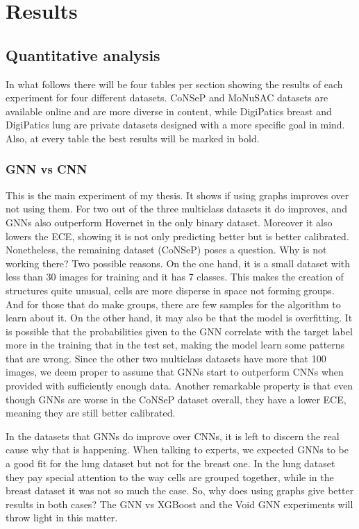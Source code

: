 \chapter{Results}
\section{Quantitative analysis}\label{sec:results}

In what follows there will be four tables per section showing the results of each experiment for four different datasets. CoNSeP and MoNuSAC datasets are available online and are more diverse in content, while DigiPatics breast and DigiPatics lung  are private datasets designed with a more specific goal in mind. Also, at every table the best results will be marked in bold.

\subsection{GNN vs CNN}

This is the main experiment of my thesis. It shows if using graphs improves over not using them. For two out of the three multiclass datasets it do improves, and GNNs also outperform Hovernet in the only binary dataset. Moreover it also lowers the ECE, showing it is not only predicting better but is better calibrated. Nonetheless, the remaining dataset (CoNSeP) poses a question. Why is not working there? Two possible reasons. On the one hand, it is a small dataset with less than 30 images for training and it has 7 classes. This makes the creation of structures quite unusual, cells are more disperse in space not forming groups. And for those that do make groups, there are few samples for the algorithm to learn about it. On the other hand, it may also be that the model is overfitting. It is possible that the probabilities given to the GNN correlate with the target label more in the training that in the test set, making the model learn some patterns that are wrong. Since the other two multiclass datasets have more that 100 images, we deem proper to assume that GNNs start to outperform CNNs when provided with sufficiently enough data. Another remarkable property is that even though GNNs are worse in the CoNSeP dataset overall, they have a lower ECE, meaning they are still better calibrated.

In the datasets that GNNs do improve over CNNs, it is left to discern the real cause why that is happening. When talking to experts, we expected GNNs to be a good fit for the lung dataset but not for the breast one. In the lung dataset they pay special attention to the way cells are grouped together, while in the breast dataset it was not so much the case. So, why does using graphs give better results in both cases? The GNN vs XGBoost and the Void GNN experiments will throw light in this matter.

